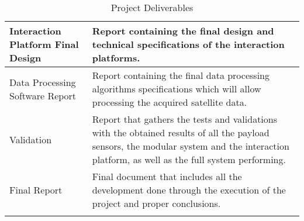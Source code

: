 \begin{longtable}[H]{>{\raggedright\arraybackslash}p{4cm} p{10cm}}
	Interaction Platform Final Design  & Report containing the final design and technical specifications of the interaction platforms.\vspace{0.2cm} \\
	
	\midrule

	Data Processing Software Report  & Report containing the final data processing algorithms specifications which will allow processing the acquired satellite data.\vspace{0.2cm} \\
	
	\midrule

	Validation & Report that gathers the tests and validations with the obtained results of all the payload sensors, the modular system and the interaction platform, as well as the full system performing.\vspace{0.2cm} \\
	
	\midrule
		
	Final Report & Final document that includes all the development done through the execution of the project and proper conclusions.\vspace{0.2cm} \\ 
	
	\bottomrule[2pt]
	
	\caption{Project Deliverables}
	\label{PDel}
\end{longtable}

